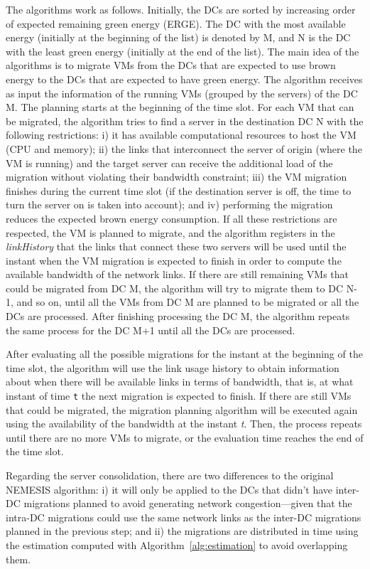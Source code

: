 The algorithms work as follows. Initially, the DCs are sorted by increasing order of expected remaining green energy (ERGE). The DC with the most available energy (initially at the beginning of the list) is denoted by M, and N is the DC with the least green energy (initially at the end of the list). The main idea of the algorithms is to migrate VMs from the DCs that are expected to use brown energy to the DCs that are expected to have green energy. The algorithm receives as input the information of the running VMs (grouped by the servers) of the DC M. The planning starts at the beginning of the time slot. For each VM that can be migrated, the algorithm tries to find a server in the destination DC N with the following restrictions: i) it has available computational resources to host the VM (CPU and memory); ii) the links that interconnect the server of origin (where the VM is running) and the target server can receive the additional load of the migration without violating their bandwidth constraint; iii) the VM migration finishes during the current time slot (if the destination server is off, the time to turn the server on is taken into account); and iv) performing the migration reduces the expected brown energy consumption. If all these restrictions are respected, the VM is planned to migrate, and the algorithm registers in the \textit{linkHistory} that the links that connect these two servers will be used until the instant when the VM migration is expected to finish in order to compute the available bandwidth of the network links. If there are still remaining VMs that could be migrated from DC M, the algorithm will try to migrate them to DC N-1, and so on, until all the VMs from DC M are planned to be migrated or all the DCs are processed. After finishing processing the DC M, the algorithm repeats the same process for the DC M+1 until all the DCs are processed.


After evaluating all the possible migrations for the instant at the beginning of the time slot, the algorithm will use the link usage history to obtain information about when there will be available links in terms of bandwidth, that is, at what instant of time \texttt{t} the next migration is expected to finish.  If there are still VMs that could be migrated, the migration planning algorithm will be executed again using the availability of the bandwidth at the instant \textit{t}. Then, the process repeats until there are no more VMs to migrate, or the evaluation time reaches the end of the time slot.

Regarding the server consolidation, there are two differences to the original NEMESIS algorithm: i) it will only be applied to the DCs that didn't have inter-DC migrations planned to avoid generating network congestion---given that the intra-DC migrations could use the same network links as the inter-DC migrations planned in the previous step; and ii) the migrations are distributed in time using the estimation computed with Algorithm~\ref{alg:estimation} to avoid overlapping them.

